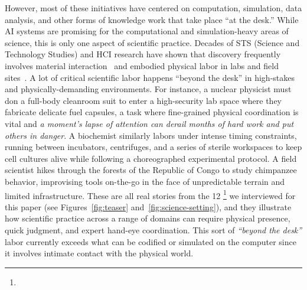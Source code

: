 However, most of these initiatives have centered on computation, simulation, data analysis, and other forms of knowledge work that take place ``at the desk.'' While AI systems are promising for the computational and simulation-heavy areas of science, this is only one aspect of scientific practice. Decades of STS (Science and Technology Studies) and HCI research have shown that discovery frequently involves material interaction~\cite{latour2013laboratory} and embodied physical labor in labs and field sites~\cite{cetina1999epistemic}. A lot of critical scientific labor happens ``beyond the desk'' in high-stakes and physically-demanding environments. For instance, a nuclear physicist must don a full-body cleanroom suit to enter a high-security lab space where they fabricate delicate fuel capsules, a task where fine-grained physical coordination is vital and \emph{a moment's lapse of attention can derail months of hard work and put others in danger}. A biochemist similarly labors under intense timing constraints, running between incubators, centrifuges, and a series of sterile workspaces to keep cell cultures alive while following a choreographed experimental protocol. A field scientist hikes through the forests of the Republic of Congo to study chimpanzee behavior, improvising tools on-the-go in the face of unpredictable terrain and limited infrastructure. These are all real stories from the 12 \footnote{} we interviewed for this paper (see Figures~\ref{fig:teaser} and~\ref{fig:science-setting}), and they illustrate how scientific practice across a range of domains can require physical presence, quick judgment, and expert hand-eye coordination. This sort of \textit{``beyond the desk''} labor currently exceeds what can be codified or simulated on the computer since it involves intimate contact with the physical world.

